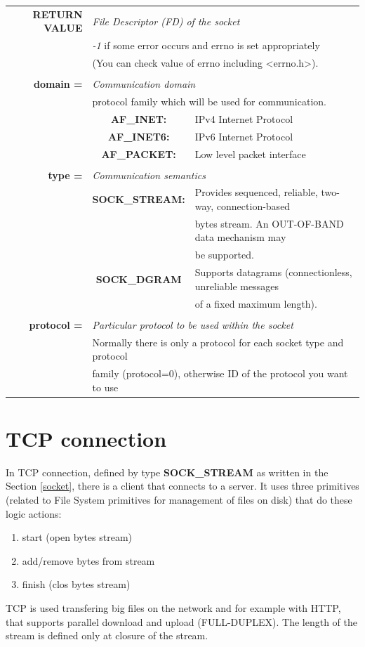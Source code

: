 \begin{table}[h]
\centering
\begin{tabular}{rcl}
\textbf{RETURN VALUE} & \multicolumn{2}{l}{\textit{File Descriptor (FD) of the socket} }\\
{} & \multicolumn{2}{l}{\textit{-1} if some error occurs and errno is set appropriately}\\
{} & \multicolumn{2}{l}{(You can check value of errno including <errno.h>).}\\
& & \\
\textbf{domain =} & \multicolumn{2}{l}{\textit{Communication domain}}\\
{} & \multicolumn{2}{l}{protocol family which will be used for communication.}\\
{} & \textbf{AF\_INET:} & {IPv4 Internet Protocol}\\
{} & \textbf{AF\_INET6:} & {IPv6 Internet Protocol}\\
{} & \textbf{AF\_PACKET:} & {Low level packet interface}\\
& &\\
\textbf{type =} & \multicolumn{2}{l}{\textit{Communication semantics}}\\
{} & \textbf{SOCK\_STREAM:} & {Provides sequenced, reliable, two-way, connection-based}\\
{} & {} & {bytes stream. An OUT-OF-BAND data mechanism may}\\
{} & {} & {be supported.}\\
{} & \textbf{SOCK\_DGRAM} & {Supports datagrams (connectionless, unreliable messages} \\
& & {of a fixed maximum length).}\\
& & \\
\textbf{protocol =} & \multicolumn{2}{l}{\textit{Particular protocol to be used within the socket}}\\
{} & \multicolumn{2}{l}{Normally there is only a protocol for each socket type and protocol}\\
{} & \multicolumn{2}{l}{family (protocol=0), otherwise ID of the protocol you want to use}\\
\end{tabular}
\end{table}

\section{TCP connection}
In TCP connection, defined by type \textbf{SOCK\_STREAM} as written in the Section \ref{socket}, there is a client that connects to a server. It uses three primitives (related to File System primitives for management of files on disk) that do these logic actions:
\begin{enumerate}
\item{start (open bytes stream)}
\item{add/remove bytes from stream}
\item{finish (clos bytes stream)}
\end{enumerate}
TCP is used transfering big files on the network and for example with HTTP, that supports parallel download and upload (FULL-DUPLEX). The length of the stream is defined only at closure of the stream.
 
